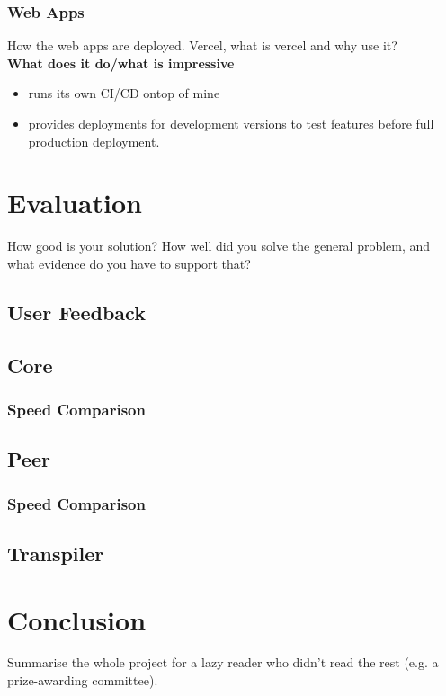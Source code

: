 \documentclass{l4proj}
\begin{document}
\subsection{Web Apps}
\text How the web apps are deployed. Vercel, what is vercel and why use it?
\\
\textbf{What does it do/what is impressive}
\begin{itemize}
    \item runs its own CI/CD ontop of mine
    \item provides deployments for development versions to test features before full production deployment.
\end{itemize}

\chapter{Evaluation} 
How good is your solution? How well did you solve the general problem, and what evidence do you have to support that?

\section{User Feedback}
\section{Core}
\subsection{Speed Comparison}
\section{Peer}
\subsection{Speed Comparison}
\section{Transpiler}

\chapter{Conclusion}    
Summarise the whole project for a lazy reader who didn't read the rest (e.g. a prize-awarding committee).
\end{document}
